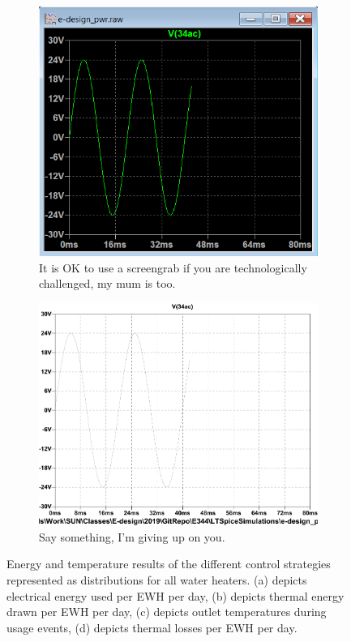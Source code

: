 \begin{figure}
\begin{subfigure}[]{0.45\textwidth}
         \includegraphics[width=1.\linewidth]{./Figures/Screengrab.png}
		\caption{It is OK to use a screengrab if you are technologically challenged, my mum is too. }
     \end{subfigure}
     \begin{subfigure}[]{0.45\textwidth}
             \centering
  		\includegraphics[width=1.0\linewidth]{./Figures/e-design_pwr_ac.pdf}
		   \caption{Say something, I'm giving up on you. }
     \end{subfigure}
   \caption[I am the short caption for the list of figures]{Energy and temperature results of the different control strategies represented as distributions for all water heaters. (a) depicts  electrical energy used per EWH per day, (b) depicts thermal energy drawn per EWH per day, (c) depicts outlet temperatures during usage events, (d) depicts thermal losses per EWH per day. }
    \label{fig:simulation_results_box}
 \end{figure}

